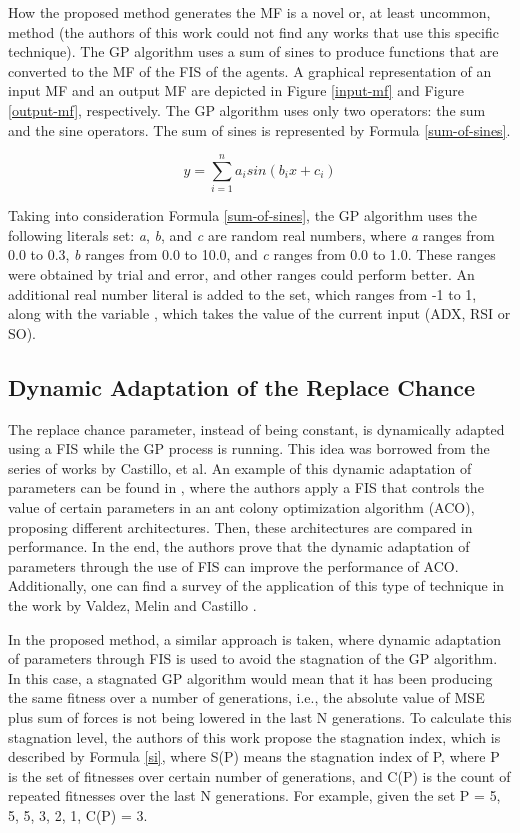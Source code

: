 \documentclass[12pt,journal,compsoc]{IEEEtran}
\begin{document}
How the proposed method generates the MF is a novel or, at least uncommon, method (the authors of this work could not find any works that use this specific technique). The GP algorithm uses a sum of sines to produce functions that are converted to the MF of the FIS of the agents. A graphical representation of an input MF and an output MF are depicted in Figure \ref{input-mf} and Figure \ref{output-mf}, respectively. The GP algorithm uses only two operators: the sum and the sine operators. The sum of sines is represented by Formula \ref{sum-of-sines}.

\begin{equation} \label{sum-of-sines}
  y = \sum_{i=1}^{n} a_{i} sin(b_{i}x + c_{i})
\end{equation}

Taking into consideration Formula \ref{sum-of-sines}, the GP algorithm uses the following literals set: \textit{a}, \textit{b}, and \textit{c} are random real numbers, where \textit{a} ranges from 0.0 to 0.3, \textit{b} ranges from 0.0 to 10.0, and \textit{c} ranges from 0.0 to 1.0. These ranges were obtained by trial and error, and other ranges could perform better. An additional real number literal is added to the set, which ranges from -1 to 1, along with the variable , which takes the value of the current input (ADX, RSI or SO).

\subsection{Dynamic Adaptation of the Replace Chance}
\label{dynamic-adaptation-of-the-replace-chance}

The replace chance parameter, instead of being constant, is dynamically adapted using a FIS while the GP process is running. This idea was borrowed from the series of works by Castillo, et al. An example of this dynamic adaptation of parameters can be found in \cite{castillo2015new}, where the authors apply a FIS that controls the value of certain parameters in an ant colony optimization algorithm (ACO), proposing different architectures. Then, these architectures are compared in performance. In the end, the authors prove that the dynamic adaptation of parameters through the use of FIS can improve the performance of ACO. Additionally, one can find a survey of the application of this type of technique in the work by Valdez, Melin and Castillo \cite{valdez2014survey}.

In the proposed method, a similar approach is taken, where dynamic adaptation of parameters through FIS is used to avoid the stagnation of the GP algorithm. In this case, a stagnated GP algorithm would mean that it has been producing the same fitness over a number of generations, i.e., the absolute value of MSE plus sum of forces is not being lowered in the last N generations. To calculate this stagnation level, the authors of this work propose the stagnation index, which is described by Formula \ref{si}, where S(P) means the stagnation index of P, where P is the set of fitnesses over certain number of generations, and C(P) is the count of repeated fitnesses over the last N generations. For example, given the set P = {5, 5, 5, 3, 2, 1}, C(P) = 3.
\end{document}
